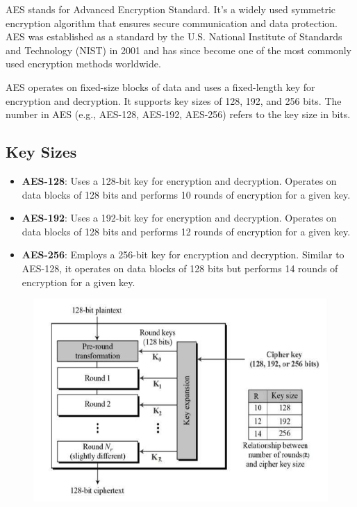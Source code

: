 \documentclass[11pt]{article}
\begin{document}
AES stands for Advanced Encryption Standard. It's a widely used symmetric encryption algorithm that ensures secure communication and data protection. AES was established as a standard by the U.S. National Institute of Standards and Technology (NIST) in 2001 and has since become one of the most commonly used encryption methods worldwide.

AES operates on fixed-size blocks of data and uses a fixed-length key for encryption and decryption. It supports key sizes of 128, 192, and 256 bits. The number in AES (e.g., AES-128, AES-192, AES-256) refers to the key size in bits.

\subsection*{Key Sizes}

\begin{itemize}
    \item \textbf{AES-128}: Uses a 128-bit key for encryption and decryption. Operates on data blocks of 128 bits and performs 10 rounds of encryption for a given key.
    \item \textbf{AES-192}: Uses a 192-bit key for encryption and decryption. Operates on data blocks of 128 bits and performs 12 rounds of encryption for a given key.
    \item \textbf{AES-256}: Employs a 256-bit key for encryption and decryption. Similar to AES-128, it operates on data blocks of 128 bits but performs 14 rounds of encryption for a given key.
\end{itemize}

\begin{figure}[htbp]
  \centering
  \includegraphics[width=1.00\textwidth]{image4.1.PNG} %
\end{figure}
\end{document}
